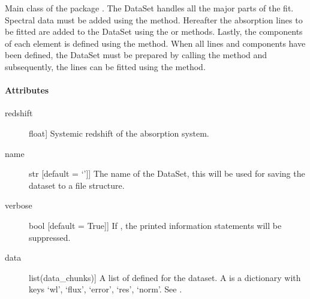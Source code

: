 \documentclass[letterpaper,10pt,english]{sphinxmanual}
\begin{document}
\begin{fulllineitems}
\label{\detokenize{api:VoigtFit.DataSet}}
Main class of the package . The DataSet handles all the major parts of the fit.
Spectral data must be added using the {\hyperref[\detokenize{api:VoigtFit.DataSet.add_data}]{}} method.
Hereafter the absorption lines to be fitted are added to the DataSet using the
{\hyperref[\detokenize{api:VoigtFit.DataSet.add_line}]{}} or
{\hyperref[\detokenize{api:VoigtFit.DataSet.add_many_lines}]{}} methods.
Lastly, the components of each element is defined using the
{\hyperref[\detokenize{api:VoigtFit.DataSet.add_component}]{}} method.
When all lines and components have been defined, the DataSet must be prepared by
calling the {\hyperref[\detokenize{api:VoigtFit.DataSet.prepare_dataset}]{}}
method and subsequently, the lines can be fitted using
the {\hyperref[\detokenize{api:VoigtFit.DataSet.fit}]{}} method.
\paragraph{Attributes}
\begin{description}
\item[{redshift}] \leavevmode{[}float{]}
Systemic redshift of the absorption system.

\item[{name}] \leavevmode{[}str   {[}default = ‘’{]}{]}
The name of the DataSet, this will be used for saving the dataset to a file structure.

\item[{verbose}] \leavevmode{[}bool   {[}default = True{]}{]}
If , the printed information statements will be suppressed.

\item[{data}] \leavevmode{[}list(data\_chunks){]}
A list of  defined for the dataset. A  is
a dictionary with keys ‘wl’, ‘flux’, ‘error’, ‘res’, ‘norm’.
See {\hyperref[\detokenize{api:VoigtFit.DataSet.add_data}]{}}.


\end{description}
\end{fulllineitems}
\end{document}

